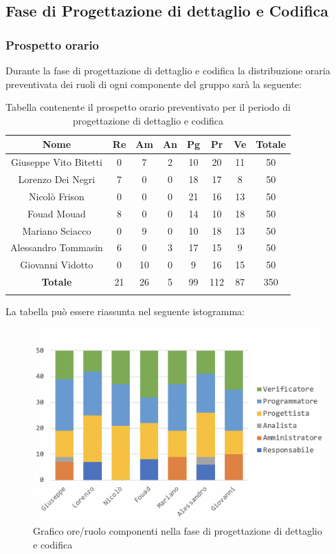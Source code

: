 		\subsection{Fase di Progettazione di dettaglio e Codifica}
		\subsubsection{Prospetto orario}
		Durante la fase di progettazione di dettaglio e codifica la distribuzione oraria preventivata dei ruoli di ogni componente del gruppo sarà la seguente:
		
		\begin{longtable}{|c|c|c|c|c|c|c|c|}
			\hline
			\rowcolor{lighter-grayer}
			\textbf{Nome} & \textbf{Re} & \textbf{Am} & \textbf{An} & \textbf{Pg}  & \textbf{Pr}   & \textbf{Ve} & \textbf{Totale} \\
			\hline
			\endfirsthead
			
			\hline
			Giuseppe Vito Bitetti 		& 0 & 7 & 2 & 10 & 20 & 11 & 50\\
			\hline
			\hline
			Lorenzo Dei Negri			& 7 & 0 & 0 & 18 & 17 & 8 & 50\\
			\hline
			\hline
			Nicolò Frison				    & 0 & 0 & 0 & 21 & 16 & 13 & 50\\
			\hline
			\hline
			Fouad Mouad 				 & 8 & 0 & 0 & 14 & 10 & 18 & 50\\
			\hline
			\hline
			Mariano Sciacco 			& 0 & 9 & 0 & 10 & 18 & 13 & 50\\
			\hline
			\hline
			Alessandro Tommasin    & 6 & 0 & 3 & 17 & 15 & 9 & 50\\
			\hline
			\hline
			Giovanni Vidotto 			 & 0 & 10 & 0 & 9 & 16 & 15 & 50\\
			\hline 
			\textbf{Totale}			 & 21 &  26 & 5 & 99 & 112 & 87 & 350\\
			\hline
			\caption{Tabella contenente il prospetto orario preventivato per il periodo di progettazione di dettaglio e codifica}
		\end{longtable}
		\pagebreak
		
		La tabella può essere riassunta nel seguente istogramma:
		\begin{figure}[H]
			\centering
			\includegraphics[width=0.8\linewidth]{./images/progDetCod1.png}
			\caption{Grafico ore/ruolo componenti nella fase di progettazione di dettaglio e codifica}
			\label{fig:grafico suddivione ruoli fase progettazione dettaglio  e codifica}
		\end{figure}
	

